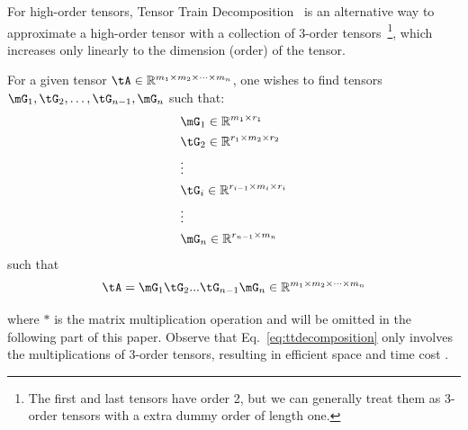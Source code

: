 For high-order tensors, Tensor Train Decomposition~ \cite{oseledets2011tensor} 
is an alternative way to approximate a high-order tensor with a collection of 3-order tensors~\footnote{The first and last tensors have order 2, but we can generally treat them as 3-order tensors with a extra dummy order of length one. }, which increases only linearly to the dimension (order) of the tensor.

For a given tensor $\tA \in \mathbb{R}^{m_1\times m_2 \times \cdots \times m_n}$, one wishes to find tensors $\mG_1, \tG_2, \ldots,\tG_{n-1} , \mG_n$ such that:
\begin{equation}
\begin{aligned}
&\mG_1 \in \mathbb{R}^{m_1 \times r_1} \\
&\tG_2 \in \mathbb{R}^{r_1 \times m_2 \times r_2}\\
&\vdots \\
&\tG_i \in \mathbb{R}^{r_{i-1} \times m_i \times r_i}\\
&\vdots \\
&\mG_n \in \mathbb{R}^{r_{n-1} \times m_n }
\end{aligned}
\end{equation}
such that
\begin{equation}
\label{eq:ttdecomposition}
\tA = \mG_1  \tG_2  ... \tG_{n-1}  \mG_n \in \mathbb{R}^{m_1\times m_2 \times \cdots \times m_n}
\end{equation}


where $*$ is the matrix multiplication operation and will be omitted in the following part of this paper. Observe that Eq.~\ref{eq:ttdecomposition} only involves the multiplications of 3-order tensors, resulting in efficient space and time cost \cite{oseledets2011tensor}. 



